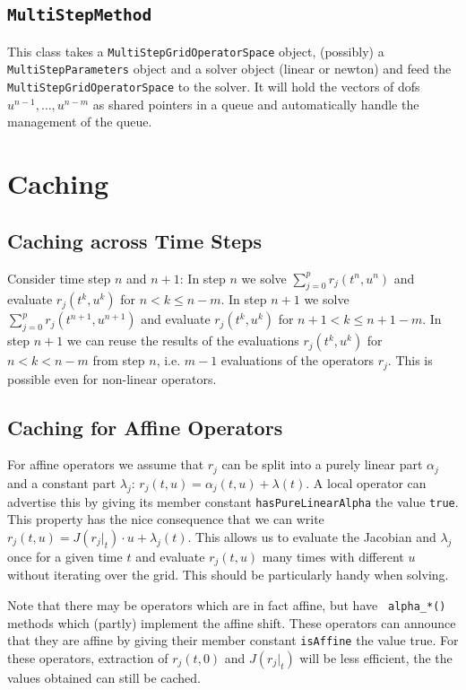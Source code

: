 \documentclass[11pt,a4paper,DIV11,%
notitlepage,oneside,abstracton,%
bibtotoc]{scrartcl}
\begin{document}
\subsection{\tt MultiStepMethod}

This class takes a {\tt MultiStepGridOperatorSpace} object, (possibly) a {\tt
  MultiStepParameters} object and a solver object (linear or newton) and feed
the {\tt MultiStepGridOperatorSpace} to the solver.  It will hold the vectors
of dofs $u^{n-1},\ldots,u^{n-m}$ as shared pointers in a queue and
automatically handle the management of the queue.

\section{Caching}

\subsection{Caching across Time Steps}

Consider time step $n$ and $n+1$: In step $n$ we solve
$\sum_{j=0}^pr_j(t^n,u^n)$ and evaluate $r_j(t^k,u^k)$ for $n<k\leq n-m$.  In
step $n+1$ we solve $\sum_{j=0}^pr_j(t^{n+1},u^{n+1})$ and evaluate
$r_j(t^k,u^k)$ for $n+1<k\leq n+1-m$.  In step $n+1$ we can reuse the results
of the evaluations $r_j(t^k,u^k)$ for $n<k<n-m$ from step $n$, i.e. $m-1$
evaluations of the operators $r_j$.  This is possible even for non-linear
operators.

\subsection{Caching for Affine Operators}

For affine operators we assume that $r_j$ can be split into a purely linear
part $\alpha_j$ and a constant part $\lambda_j$:
$r_j(t,u)=\alpha_j(t,u)+\lambda(t)$.  A local operator can advertise this by
giving its member constant {\tt hasPureLinearAlpha} the value {\tt true}.
This property has the nice consequence that we can write
$r_j(t,u)=J(r_j|_t)\cdot u+\lambda_j(t)$.  This allows us to evaluate the
Jacobian and $\lambda_j$ once for a given time $t$ and evaluate $r_j(t,u)$
many times with different $u$ without iterating over the grid.  This should be
particularly handy when solving.

Note that there may be operators which are in fact affine, but have {\tt
  alpha\_*()} methods which (partly) implement the affine shift.  These
operators can announce that they are affine by giving their member constant
{\tt isAffine} the value true.  For these operators, extraction of $r_j(t,0)$
and $J(r_j|_t)$ will be less efficient, the the values obtained can still be
cached.
\end{document}
